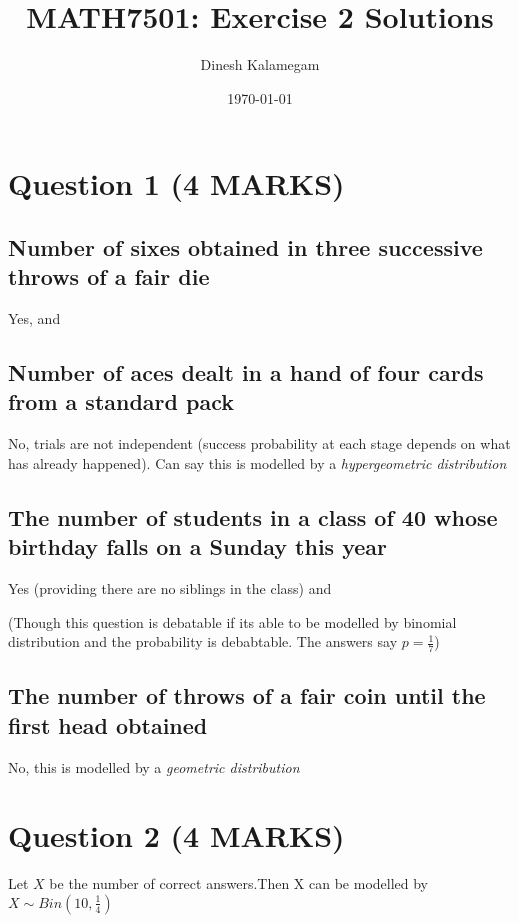 \documentclass[11pt]{article}
\begin{document}
\title{MATH7501: Exercise 2 Solutions}
\author{Dinesh Kalamegam}
\date{\today}
\maketitle

\newtheorem{theorem}{Theorem}[section]
\newtheorem{definition}[theorem]{Defintion}
\newtheorem{proposition}[theorem]{Proposition}
\newtheorem{corollary}[theorem]{Corollary}

\section{Question 1 (4 MARKS)}
\subsection{Number of sixes obtained in three successive throws of a fair die}
Yes,  and 

\subsection{Number of aces dealt in a hand of four cards from a standard pack }
No, trials are not independent (success probability at each stage depends on what has already happened). Can say this is modelled by a \emph{hypergeometric distribution}

\subsection{The number of students in a class of 40 whose birthday falls on a Sunday this year}
Yes (providing there are no siblings in the class)   and 

\noindent (Though this question is debatable if its able to be modelled by binomial distribution and the probability is debabtable. The answers say $p= \frac{1}{7}$)

\subsection{The number of throws of a fair coin until the first head obtained}
No, this is modelled by a \emph{geometric distribution}

\section{Question 2 (4 MARKS)}
Let $X$ be the number of correct answers.Then X can be modelled by $ X \sim Bin(10,\frac{1}{4})$
\end{document}

